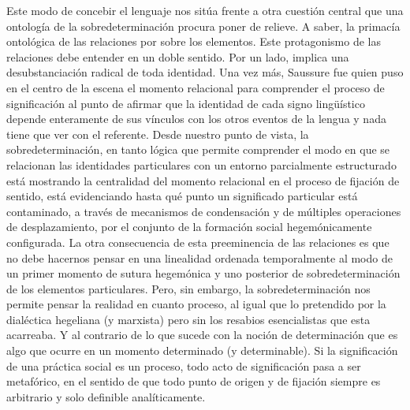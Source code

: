 Este modo de concebir el lenguaje nos sitúa frente a otra cuestión central que una ontología de la sobredeterminación procura poner de relieve. A saber, la primacía ontológica de las relaciones por sobre los elementos. Este protagonismo de las relaciones debe entender en un doble sentido. Por un lado, implica una desubstanciación radical de toda identidad. Una vez más, Saussure fue quien puso en el centro de la escena el momento relacional para comprender el proceso de significación al punto de afirmar que la identidad de cada signo lingüístico depende enteramente de sus vínculos  con los otros eventos de la lengua y nada tiene que ver con el referente. Desde nuestro punto de vista, la sobredeterminación, en tanto lógica que permite comprender el modo en que se relacionan las identidades particulares con un entorno parcialmente estructurado está mostrando la centralidad del momento relacional en el proceso de fijación de sentido, está evidenciando hasta qué punto un significado particular está contaminado, a través de mecanismos de condensación y de múltiples operaciones de desplazamiento, por el conjunto de la formación social hegemónicamente configurada. La otra consecuencia de esta preeminencia de las relaciones es que no debe hacernos pensar en una linealidad ordenada temporalmente al modo de un primer momento de sutura hegemónica y uno posterior de sobredeterminación de los elementos particulares. Pero, sin embargo, la sobredeterminación nos permite pensar la realidad en cuanto proceso, al igual que lo pretendido por la dialéctica hegeliana (y marxista) pero sin los resabios esencialistas que esta acarreaba. Y al contrario de lo que sucede con la noción de determinación que es algo que ocurre en un momento determinado (y determinable). Si la significación de una práctica social es un proceso, todo acto de significación pasa a ser metafórico, en el sentido de que todo punto de origen y de fijación siempre es arbitrario y solo definible analíticamente.

